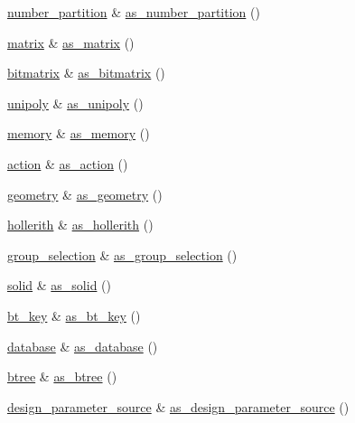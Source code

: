 \begin{DoxyCompactItemize}
\item 
\mbox{\hyperlink{classnumber__partition}{number\+\_\+partition}} \& \mbox{\hyperlink{classdiscreta__base_a307aa09de0e925d46697707968ffab00}{as\+\_\+number\+\_\+partition}} ()
\item 
\mbox{\hyperlink{classmatrix}{matrix}} \& \mbox{\hyperlink{classdiscreta__base_ae4d7f56d917a4707b838fbffde6467ff}{as\+\_\+matrix}} ()
\item 
\mbox{\hyperlink{classbitmatrix}{bitmatrix}} \& \mbox{\hyperlink{classdiscreta__base_a071ad54ea8ef6c9d1d15f532e5a76df6}{as\+\_\+bitmatrix}} ()
\item 
\mbox{\hyperlink{classunipoly}{unipoly}} \& \mbox{\hyperlink{classdiscreta__base_ad50d8027f039fe5c2478cddb243adc9d}{as\+\_\+unipoly}} ()
\item 
\mbox{\hyperlink{classmemory}{memory}} \& \mbox{\hyperlink{classdiscreta__base_ad94b2d7dce0cd4fa22db57f6e79c4bd2}{as\+\_\+memory}} ()
\item 
\mbox{\hyperlink{classaction}{action}} \& \mbox{\hyperlink{classdiscreta__base_aee03453d453c64f57eb30bf482d3ba8a}{as\+\_\+action}} ()
\item 
\mbox{\hyperlink{classgeometry}{geometry}} \& \mbox{\hyperlink{classdiscreta__base_a38fc7b4cdd830703e9d87354b79bc5c8}{as\+\_\+geometry}} ()
\item 
\mbox{\hyperlink{classhollerith}{hollerith}} \& \mbox{\hyperlink{classdiscreta__base_a3e66f82711f314710107e2f29e589690}{as\+\_\+hollerith}} ()
\item 
\mbox{\hyperlink{classgroup__selection}{group\+\_\+selection}} \& \mbox{\hyperlink{classdiscreta__base_aae1bac4883c567718bef9fb610abbdc8}{as\+\_\+group\+\_\+selection}} ()
\item 
\mbox{\hyperlink{classsolid}{solid}} \& \mbox{\hyperlink{classdiscreta__base_a1fc5f2b85ec97ab0a69dd64903c970a5}{as\+\_\+solid}} ()
\item 
\mbox{\hyperlink{classbt__key}{bt\+\_\+key}} \& \mbox{\hyperlink{classdiscreta__base_a2734c6e08dca17cf6588bd5064ec1b9f}{as\+\_\+bt\+\_\+key}} ()
\item 
\mbox{\hyperlink{classdatabase}{database}} \& \mbox{\hyperlink{classdiscreta__base_ab055d39d58210a2b03ba3d33703b09a9}{as\+\_\+database}} ()
\item 
\mbox{\hyperlink{classbtree}{btree}} \& \mbox{\hyperlink{classdiscreta__base_a78e76674cef2ec113c17989c11288778}{as\+\_\+btree}} ()
\item 
\mbox{\hyperlink{classdesign__parameter__source}{design\+\_\+parameter\+\_\+source}} \& \mbox{\hyperlink{classdiscreta__base_a59cbf837c6582ded5bc586265d13d81a}{as\+\_\+design\+\_\+parameter\+\_\+source}} ()

\end{DoxyCompactItemize}
